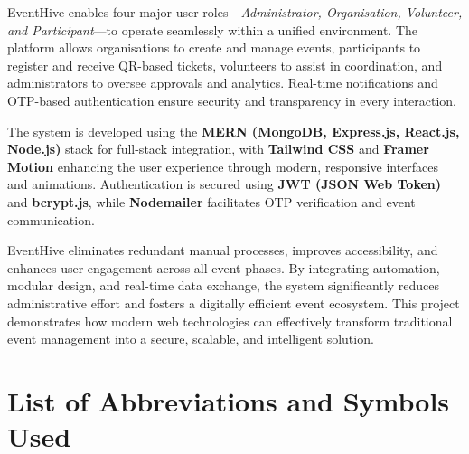 \documentclass[12pt,a4paper]{report}
\begin{document}
EventHive enables four major user roles—\textit{Administrator, Organisation, Volunteer, and Participant}—to operate seamlessly within a unified environment. The platform allows organisations to create and manage events, participants to register and receive QR-based tickets, volunteers to assist in coordination, and administrators to oversee approvals and analytics. Real-time notifications and OTP-based authentication ensure security and transparency in every interaction.

The system is developed using the \textbf{MERN (MongoDB, Express.js, React.js, Node.js)} stack for full-stack integration, with \textbf{Tailwind CSS} and \textbf{Framer Motion} enhancing the user experience through modern, responsive interfaces and animations. Authentication is secured using \textbf{JWT (JSON Web Token)} and \textbf{bcrypt.js}, while \textbf{Nodemailer} facilitates OTP verification and event communication.

EventHive eliminates redundant manual processes, improves accessibility, and enhances user engagement across all event phases. By integrating automation, modular design, and real-time data exchange, the system significantly reduces administrative effort and fosters a digitally efficient event ecosystem. This project demonstrates how modern web technologies can effectively transform traditional event management into a secure, scalable, and intelligent solution.

\clearpage

\tableofcontents
\clearpage

\listoffigures
{}
\clearpage


\chapter*{List of Abbreviations and Symbols Used}
\end{document}
